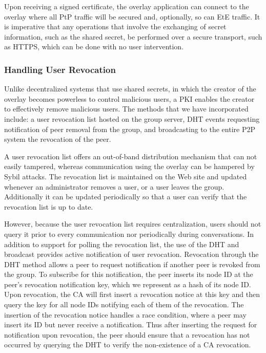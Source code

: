 \documentclass[conference]{IEEEtran}
\begin{document}
Upon receiving a signed certificate, the overlay application can connect to the
overlay where all PtP traffic will be secured and, optionally, so can EtE
traffic.  It is imperative that any operations that involve the exchanging of
secret information, such as the shared secret, be performed over a secure
transport, such as HTTPS, which can be done with no user intervention.

\subsubsection{Handling User Revocation}
Unlike decentralized systems that use shared secrets, in which the creator of
the overlay becomes powerless to control malicious users, a PKI enables the
creator to effectively remove malicious users.  The methods that we have
incorporated include:  a user revocation list hosted on the group server,
DHT events requesting notification of peer removal from the group, and
broadcasting to the entire P2P system the revocation of the peer.

A user revocation list offers an out-of-band distribution mechanism that can
not easily tampered, whereas communication using the overlay can be hampered
by Sybil attacks.  The revocation list is maintained on the Web site and updated
whenever an administrator removes a user, or a user leaves the group.
Additionally it can be updated periodically so that a user can verify that the revocation
list is up to date.

However, because the user revocation list requires centralization, users should
not query it prior to every communication nor periodically during conversations.
In addition to support for polling the revocation list, the use of the DHT and broadcast provides active notification of
user revocation.  Revocation through the DHT method allows a peer to request
notification if another peer is revoked from the group.  To subscribe for this
notification, the peer inserts its node ID at the peer's revocation
notification key, which we represent as a hash of its node ID.  Upon revocation,
the CA will first insert a revocation notice at this key and then query the
key for all node IDs notifying each of them of the revocation.  The insertion
of the revocation notice handles a race condition, where a peer may insert
its ID but never receive a notification.  Thus after inserting the request for
notification upon revocation, the peer should ensure that a revocation has not
occurred by querying the DHT to verify the non-existence of a CA revocation.
\end{document}

